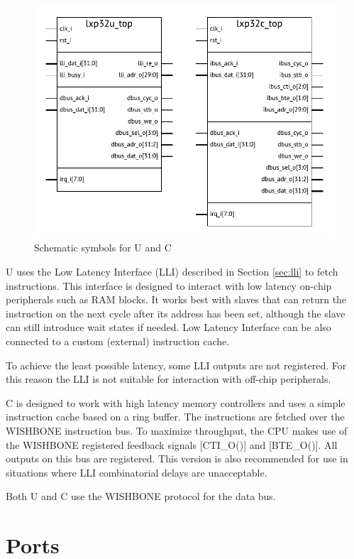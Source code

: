 \documentclass[a4paper,12pt,twoside,extrafontsizes]{memoir}
\begin{document}
\begin{figure}[htbp]
	\centering
	\includegraphics[scale=0.85]{images/symbols.pdf}
	\caption{Schematic symbols for \lxp{}U and \lxp{}C}
	\label{fig:symbols}
\end{figure}

\lxp{}U uses the Low Latency Interface (LLI) described in Section \ref{sec:lli} to fetch instructions. This interface is designed to interact with low latency on-chip peripherals such as RAM blocks. It works best with slaves that can return the instruction on the next cycle after its address has been set, although the slave can still introduce wait states if needed. Low Latency Interface can be also connected to a custom (external) instruction cache.

To achieve the least possible latency, some LLI outputs are not registered. For this reason the LLI is not suitable for interaction with off-chip peripherals.

\lxp{}C is designed to work with high latency memory controllers and uses a simple instruction cache based on a ring buffer. The instructions are fetched over the WISHBONE instruction bus. To maximize throughput, the CPU makes use of the WISHBONE registered feedback signals [CTI\_O()] and [BTE\_O()]. All outputs on this bus are registered. This version is also recommended for use in situations where LLI combinatorial delays are unacceptable.

Both \lxp{}U and \lxp{}C use the WISHBONE protocol for the data bus.

\section{Ports}
\end{document}

